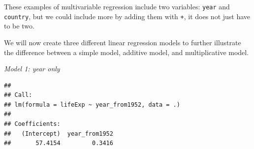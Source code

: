 \documentclass[
  12pt,
  krantz2]{krantz}
\makeatletter
\newenvironment{Shaded}{\begin{snugshade}}{\end{snugshade}}
\newcommand{\CommentTok}[1]{\textcolor[rgb]{0.56,0.35,0.01}{\textit{#1}}}
\newcommand{\DataTypeTok}[1]{\textcolor[rgb]{0.13,0.29,0.53}{#1}}
\newcommand{\KeywordTok}[1]{\textcolor[rgb]{0.13,0.29,0.53}{\textbf{#1}}}
\newcommand{\NormalTok}[1]{#1}
\newcommand{\OperatorTok}[1]{\textcolor[rgb]{0.81,0.36,0.00}{\textbf{#1}}}
\newcommand{\StringTok}[1]{\textcolor[rgb]{0.31,0.60,0.02}{#1}}
\newenvironment{kframe}{%
\medskip{}
\setlength{\fboxsep}{.8em}
 \def\at@end@of@kframe{}%
 \ifinner\ifhmode%
  \def\at@end@of@kframe{\end{minipage}}%
  \begin{minipage}{\columnwidth}%
 \fi\fi%
 \def\FrameCommand##1{\hskip\@totalleftmargin \hskip-\fboxsep
 \colorbox{shadecolor}{##1}\hskip-\fboxsep
     \hskip-\linewidth \hskip-\@totalleftmargin \hskip\columnwidth}%
 \MakeFramed {\advance\hsize-\width
   \@totalleftmargin\z@ \linewidth\hsize
   \@setminipage}}%
 {\par\unskip\endMakeFramed%
 \at@end@of@kframe}
\renewenvironment{Shaded}{\begin{kframe}}{\end{kframe}}
\makeatother
\begin{document}
These examples of multivariable regression include two variables: \texttt{year} and \texttt{country}, but we could include more by adding them with \texttt{+}, it does not just have to be two.

We will now create three different linear regression models to further illustrate the difference between a simple model, additive model, and multiplicative model.

\emph{Model 1: year only}

\begin{Shaded}
\end{Shaded}

\begin{verbatim}
## 
## Call:
## lm(formula = lifeExp ~ year_from1952, data = .)
## 
## Coefficients:
##   (Intercept)  year_from1952  
##       57.4154         0.3416
\end{verbatim}

\begin{Shaded}
\end{Shaded}
\end{document}
